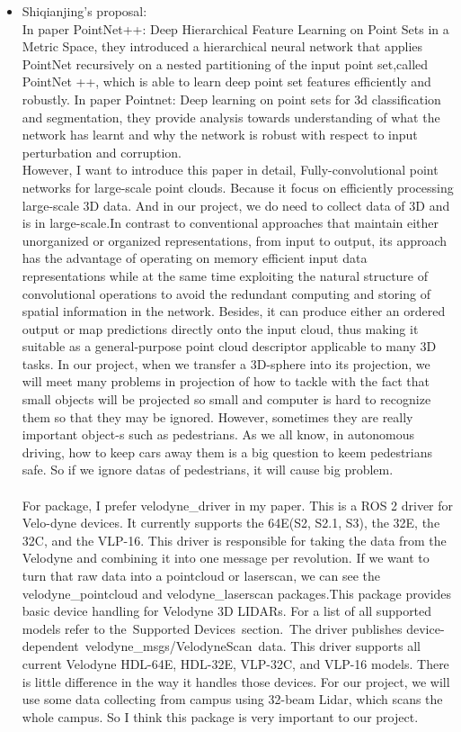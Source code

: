 \documentclass{article}
\begin{document}
\begin{normalsize}
\begin{itemize}
\item Shiqianjing's proposal:\\
In paper PointNet++: Deep Hierarchical Feature Learning on Point Sets in a Metric Space, they introduced a hierarchical neural network that applies PointNet recursively on a nested partitioning of the input point set,called PointNet ++, which is able to learn deep point set features efficiently and robustly. In paper  Pointnet: Deep learning on point sets for 3d classification and segmentation, they provide analysis towards understanding of what the network has learnt and why the network is robust with respect to input perturbation and corruption.\\

However, I want to introduce this paper in detail, Fully-convolutional point networks for large-scale point clouds. Because it focus on efficiently processing large-scale 3D data. And in our project, we do need to collect data of 3D and is in large-scale.In contrast to conventional approaches that maintain either unorganized or  organized representations, from input to output, its approach has the advantage of operating on memory efficient input data representations while at the same time exploiting the natural structure of convolutional operations to avoid the redundant computing and storing of spatial information in the network. Besides, it can produce either an ordered output or map predictions directly onto the input cloud,  thus making it suitable as a general-purpose point cloud descriptor applicable to many 3D tasks. In our project, when we transfer a 3D-sphere into its projection, we will meet many problems in projection of how to tackle with the fact that     small objects will be projected so small and computer is hard to recognize them  so that they may be ignored. However, sometimes they are really important object-s such as pedestrians. As we all know, in autonomous driving, how to keep cars away them is a big question to keem pedestrians safe. So if we ignore datas of pedestrians, it will cause big problem.
\\\\
For package, I prefer velodyne\_driver in my paper. This is a ROS 2 driver for Velo-dyne devices. It currently supports the 64E(S2, S2.1, S3), the 32E, the 32C, and the VLP-16. This driver is responsible for taking the data from the Velodyne and  combining it into one message per revolution. If we want to turn that raw data    into a pointcloud or laserscan, we can see the velodyne\_pointcloud and velodyne\_laserscan packages.This package provides basic device handling for Velodyne 3D LIDARs. For a list of all supported models refer to the Supported Devices section. The driver publishes device-dependent velodyne\_msgs/VelodyneScan data. This driver supports all current Velodyne HDL-64E, HDL-32E, VLP-32C, and VLP-16 models. There is little difference in the way it handles those devices. For our project,  we will use some data collecting from campus using 32-beam Lidar, which scans the whole campus. So I think this package is very important to our project.



\end{itemize}
\end{normalsize}
\end{document}
